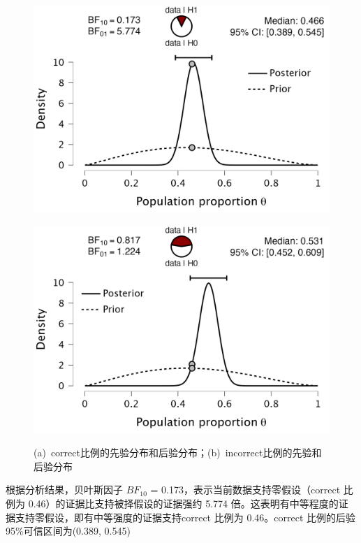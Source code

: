 \documentclass[stu,12pt,floatsintext]{apa7} %
\begin{document}
\begin{figure}[H]
    \centering
    \begin{minipage}{0.48\textwidth}
        \centering
        \subcaption{}
        \vspace{-0.5em}
        \includegraphics[width=\textwidth]{figure/correct.png}
        \label{fig:correct}
    \end{minipage}
    \begin{minipage}{0.48\textwidth}
        \centering
        \subcaption{}
        \vspace{-0.5em}
        \includegraphics[width=\textwidth]{figure/incorrect.png}
        \label{fig:incorrect}
    \end{minipage}
    \captionsetup{labelsep=period}
    \caption{\rm (a)\ correct比例的先验分布和后验分布；(b)\ incorrect比例的先验和后验分布}
    \label{fig:BinomialTestPlot}
\end{figure}

根据分析结果，贝叶斯因子 \(BF_{10}\) = 0.173，表示当前数据支持零假设（correct 比例为 0.46）的证据比支持被择假设的证据强约 5.774 倍。这表明有中等程度的证据支持零假设，即有中等强度的证据支持correct 比例为 0.46。correct 比例的后验 95\%可信区间为(0.389, 0.545)
\end{document}
